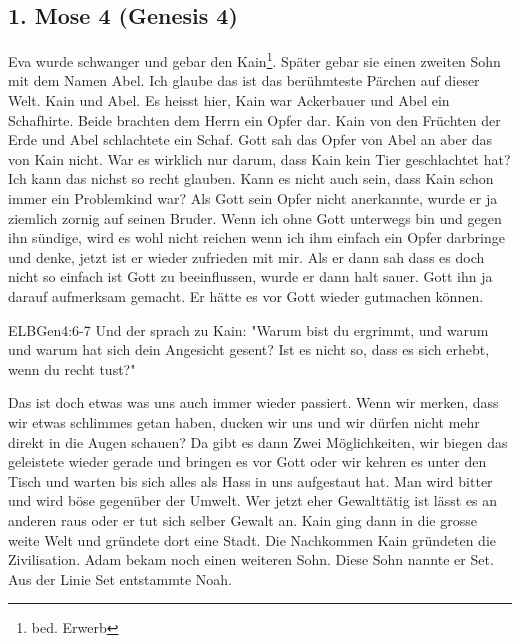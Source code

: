 \subsection{1. Mose 4 (Genesis 4)}
Eva wurde schwanger und gebar den Kain\footnote{bed. Erwerb}. Später gebar sie einen zweiten Sohn mit dem Namen Abel. Ich glaube das ist das berühmteste Pärchen auf dieser Welt. Kain und Abel. Es heisst hier, Kain war Ackerbauer und Abel ein Schafhirte. Beide brachten dem Herrn ein Opfer dar. Kain von den Früchten der Erde und Abel schlachtete ein Schaf. Gott sah das Opfer von Abel an aber das von Kain nicht. War es wirklich nur darum, dass Kain kein Tier geschlachtet hat? Ich kann das nichst so recht glauben. Kann es nicht auch sein, dass Kain schon immer ein Problemkind war? Als Gott sein Opfer nicht anerkannte, wurde er ja ziemlich zornig auf seinen Bruder. Wenn ich ohne Gott unterwegs bin und gegen ihn sündige, wird es wohl nicht reichen wenn ich ihm einfach ein Opfer darbringe und denke, jetzt ist er wieder zufrieden mit mir. Als er dann sah dass es doch nicht so einfach ist Gott zu beeinflussen, wurde er dann halt sauer. Gott ihn ja darauf aufmerksam gemacht. Er hätte es vor Gott wieder gutmachen können.
\begin{bibeltext}{ELB}{Gen}{4:6-7}
	Und der \herr{} sprach zu Kain: "Warum bist du ergrimmt, und warum und warum hat sich dein Angesicht gesent? Ist es nicht so, dass es sich erhebt, wenn du recht tust?"
\end{bibeltext}
Das ist doch etwas was uns auch immer wieder passiert. Wenn wir merken, dass wir etwas schlimmes getan haben, ducken wir uns und wir dürfen nicht mehr direkt in die Augen schauen? Da gibt es dann Zwei Möglichkeiten, wir biegen das geleistete wieder gerade und bringen es vor Gott oder wir kehren es unter den Tisch und warten bis sich alles als Hass in uns aufgestaut hat. Man wird bitter und wird böse gegenüber der Umwelt. Wer jetzt eher Gewalttätig ist lässt es an anderen raus oder er tut sich selber Gewalt an. Kain ging dann in die grosse weite Welt und gründete dort eine Stadt. Die Nachkommen Kain gründeten die Zivilisation. Adam bekam noch einen weiteren Sohn. Diese Sohn nannte er Set. Aus der Linie Set entstammte Noah.

